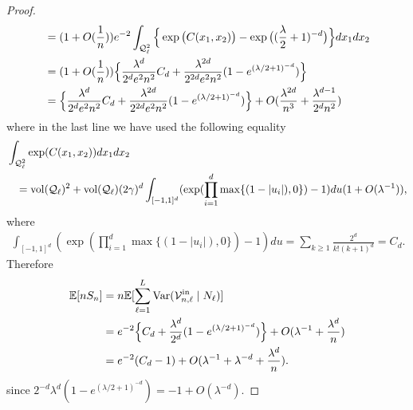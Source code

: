\documentclass[11pt]{article}
\newcommand{\E}{\mathbb{E}}
\newcommand{\mQ}{\mathcal{Q}}
\newcommand{\vol}{\mathrm{vol}}
\newcommand{\abs}[1]{| #1|}
\newcommand{\var}{\mathrm{Var}}
\begin{document}
\begin{proof}
\begin{align*}
        &= (1 + O(\frac{1}{n}))e^{-2}\int_{\mQ_\ell^2} \Big\{\exp\big(C(x_1, x_2)\big) - \exp\big((\frac{\lambda}{2} + 1)^{-d}\big)\Big\}dx_1 dx_2 \notag \\
        &= (1 + O(\frac{1}{n}))\Big\{\frac{\lambda^d}{2^d e^{2}n^2}C_d + \frac{\lambda^{2d}}{2^{2d}e^2n^2}(1 - e^{(\lambda/2 + 1)^{-d}})\Big\} \notag\\
        &= \Big\{\frac{\lambda^d}{2^d e^{2}n^2}C_d + \frac{\lambda^{2d}}{2^{2d}e^2n^2}(1 - e^{(\lambda/2 + 1)^{-d}})\Big\} + O(\frac{\lambda^{2d}}{n^3} + \frac{\lambda^{d-1}}{2^d n^2}) 
    \end{align*}
    where in the last line we have used the following equality 
    \begin{align*}
        &\int_{\mQ_\ell^2}\exp(C(x_1, x_2)) dx_1 dx_2\\
        & \hspace{0.3cm}=   \vol(\mQ_\ell)^2 + \vol(\mQ_\ell)(2\gamma)^d \int_{[-1, 1]^d}(\exp(\prod_{i=1}^d\max\{(1 - \abs{u_i}), 0\}) - 1)du (1 + O(\lambda^{-1})),
    \end{align*}
    where
    \begin{align*}
       \int_{[-1, 1]^d}(\exp(\prod_{i=1}^d\max\{(1 - \abs{u_i}), 0\}) - 1)du = \sum_{k\geq 1}\frac{2^d}{k!(k + 1)^d} = C_d.
    \end{align*}
    Therefore
    \begin{align}\label{eq:ControlExp}
        \E[nS_n] &= n\E[\sum_{\ell = 1}^L \var(\mathcal{V}_{n, \ell}^{\mathrm{in}}\mid N_\ell)] \notag\\
        &= e^{-2}\Big\{C_d + \frac{\lambda^d}{2^d}(1 - e^{(\lambda/2 + 1)^{-d}})\Big\} + O(\lambda^{-1} + \frac{\lambda^d}{n})\notag\\
        &= e^{-2}(C_d - 1) + O(\lambda^{-1} + \lambda^{-d} + \frac{\lambda^d}{n}).
    \end{align}
    since $2^{-d}\lambda^d(1 - e^{(\lambda/2 + 1)^{-d}}) = -1 + O(\lambda^{-d})$.
    

\end{proof}
\end{document}
